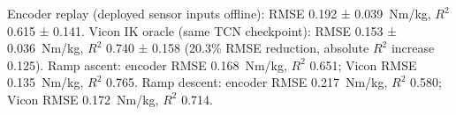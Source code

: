 Encoder replay (deployed sensor inputs offline): RMSE 0.192 ± 0.039~Nm/kg, $R^2$ 0.615 ± 0.141.
Vicon IK oracle (same TCN checkpoint): RMSE 0.153 ± 0.036~Nm/kg, $R^2$ 0.740 ± 0.158
(20.3\% RMSE reduction, absolute $R^2$ increase 0.125).
Ramp ascent: encoder RMSE 0.168~Nm/kg, $R^2$ 0.651; Vicon RMSE 0.135~Nm/kg, $R^2$ 0.765.
Ramp descent: encoder RMSE 0.217~Nm/kg, $R^2$ 0.580; Vicon RMSE 0.172~Nm/kg, $R^2$ 0.714.
